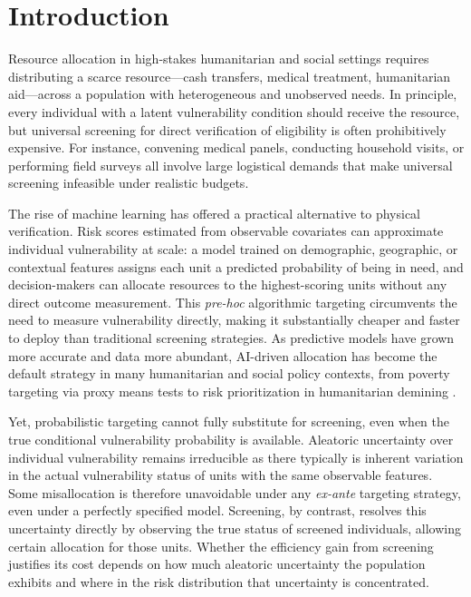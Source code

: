 \section{Introduction}

Resource allocation in high-stakes humanitarian and social settings requires distributing a scarce resource---cash transfers, medical treatment, humanitarian aid---across a population with heterogeneous and unobserved needs. In principle, every individual with a latent vulnerability condition should receive the resource, but universal screening for direct verification of eligibility is often prohibitively expensive. For instance, convening medical panels, conducting household visits, or performing field surveys \cite{Harutyunyan2023OperationalEfficiency, who2020screening, hill2010examination} all involve large logistical demands that make universal screening infeasible under realistic budgets.


The rise of machine learning has offered a practical alternative to physical verification. Risk scores estimated from observable covariates can approximate individual vulnerability at scale: a model trained on demographic, geographic, or contextual features assigns each unit a predicted probability of being in need, and decision-makers can allocate resources to the highest-scoring units without any direct outcome measurement. This \textit{pre-hoc} algorithmic targeting circumvents the need to measure vulnerability directly, making it substantially cheaper and faster to deploy than traditional screening strategies. As predictive models have grown more accurate and data more abundant, AI-driven allocation has become the default strategy in many humanitarian and social policy contexts, from poverty targeting via proxy means tests \cite{grosh1995proxy, aiken2022machine} to risk prioritization in humanitarian demining \cite{dulce2024reland, cirillo2024desk}.



Yet, probabilistic targeting cannot fully substitute for screening, even when the true conditional vulnerability probability is available. Aleatoric uncertainty over individual vulnerability remains irreducible as there typically is inherent variation in the actual vulnerability status of units with the same observable features. Some misallocation is therefore unavoidable under any \textit{ex-ante} targeting strategy, even under a perfectly specified model. Screening, by contrast, resolves this uncertainty directly by observing the true status of screened individuals, allowing certain allocation for those units. Whether the efficiency gain from screening justifies its cost depends on how much aleatoric uncertainty the population exhibits and where in the risk distribution that uncertainty is concentrated.


